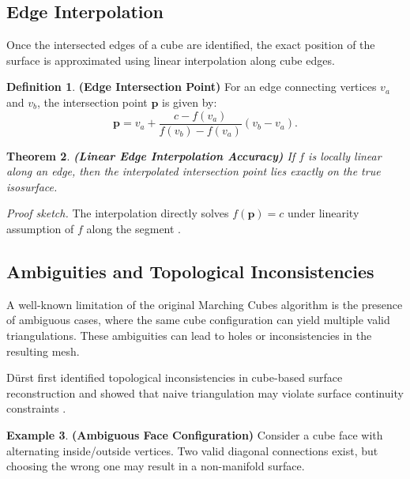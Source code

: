 \documentclass[12pt, a4paper, oneside]{book}
\theoremstyle{plain}
\newtheorem{theorem}{Theorem}[chapter]
\theoremstyle{definition}
\newtheorem{definition}[theorem]{Definition}
\newtheorem{example}[theorem]{Example}
\theoremstyle{remark}
\theoremstyle{definition}
\begin{document}
\subsection{Edge Interpolation}

Once the intersected edges of a cube are identified, the exact position of the surface is approximated using linear interpolation along cube edges.

\begin{definition}
    \textbf{(Edge Intersection Point)}
For an edge connecting vertices $v_a$ and $v_b$, the intersection point $\mathbf{p}$ is given by:
\[
\mathbf{p} = v_a + \frac{c - f(v_a)}{f(v_b) - f(v_a)} (v_b - v_a).
\]
\end{definition}

\begin{theorem}
    \textbf{(Linear Edge Interpolation Accuracy)}
If $f$ is locally linear along an edge, then the interpolated intersection point lies exactly on the true isosurface.
\end{theorem}


\textit{Proof sketch.} The interpolation directly solves $f(\mathbf{p}) = c$ under linearity assumption of $f$ along the segment \cite{lorensen1998marching}.

\vspace{0.5em}

\subsection{Ambiguities and Topological Inconsistencies}

A well-known limitation of the original Marching Cubes algorithm is the presence of ambiguous cases, where the same cube configuration can yield multiple valid triangulations. These ambiguities can lead to holes or inconsistencies in the resulting mesh.

Dürst first identified topological inconsistencies in cube-based surface reconstruction and showed that naive triangulation may violate surface continuity constraints \cite{durst1988marching}.

\begin{example}
    \textbf{(Ambiguous Face Configuration)}
Consider a cube face with alternating inside/outside vertices. Two valid diagonal connections exist, but choosing the wrong one may result in a non-manifold surface.
\end{example}


\vspace{0.5em}
\end{document}
